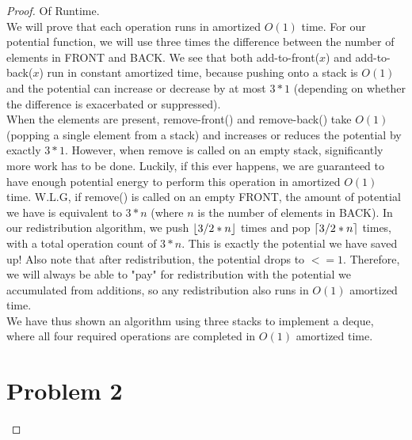 \documentclass{article}
\DeclarePairedDelimiter{\floor}{\lfloor}{\rfloor}
\DeclarePairedDelimiter{\ceil}{\lceil}{\rceil}
\theoremstyle{casestyle}
\begin{document}
\begin{proof} Of Runtime.\\
  We will prove that each operation runs in amortized $O(1)$ time. For our potential function, we will use three times the difference between the number of elements in FRONT and BACK. We see that both add-to-front($x$) and add-to-back($x$) run in constant amortized time, because pushing onto a stack is $O(1)$ and the potential can  increase or decrease by at most $3 * 1$ (depending on whether the difference is exacerbated or suppressed). \\

  When the elements are present, remove-front() and remove-back() take $O(1)$ (popping a single element from a stack) and increases or reduces the potential by exactly $3 * 1$. However, when remove is called on an empty stack, significantly more work has to be done. Luckily, if this ever happens, we are guaranteed to have enough potential energy to perform this operation in amortized $O(1)$ time. W.L.G, if remove() is called on an empty FRONT, the amount of potential we have is equivalent to $3 * n$ (where $n$ is the number of elements in BACK). In our redistribution algorithm, we push $\floor*{3/2 * n}$ times and pop $\ceil*{3/2 * n}$ times, with a total operation count of $3 * n$. This is exactly the potential we have saved up! Also note that after redistribution, the potential drops to $<= 1$. Therefore, we will always be able to "pay" for redistribution with the potential we accumulated from additions, so any redistribution also runs in $O(1)$ amortized time. \\

  We have thus shown an algorithm using three stacks to implement a deque, where all four required operations are completed in $O(1)$ amortized time. \\

  \section *{Problem 2}


\end{proof}
\end{document}
